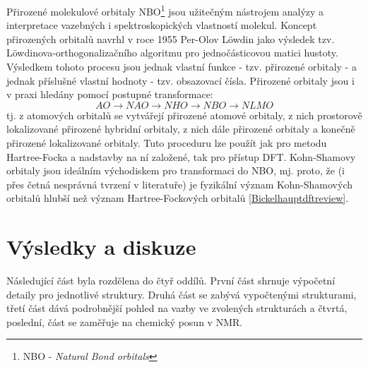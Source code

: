 \documentclass[
digital, %
table,   %
lof,     %
lot,     %
oneside,
]{fithesis3}
\begin{document}
Přirozené molekulové orbitaly NBO\footnote{NBO - \textit{Natural Bond orbitals}} jsou užitečným nástrojem analýzy a interpretace vazebných i spektroskopických vlastností molekul. Koncept přirozených orbitalů navrhl v roce 1955 Per-Olov Löwdin jako výsledek tzv. Löwdinova-orthogonalizačního algoritmu pro jednočásticovou matici hustoty. Výsledkem tohoto procesu jsou jednak vlastní funkce - tzv. přirozené orbitaly - a jednak příslušné vlastní hodnoty - tzv. obsazovací čísla. Přirozené orbitaly jsou i v praxi hledány pomocí postupné transformace:
\begin{displaymath}
AO \longrightarrow NAO \longrightarrow NHO \longrightarrow NBO \longrightarrow NLMO
\end{displaymath}
tj. z atomových orbitalů se vytvářejí přirozené atomové orbitaly, z nich prostorově lokalizované přirozené hybridní orbitaly, z nich dále přirozené orbitaly  a konečně přirozené lokalizované orbitaly. Tuto proceduru lze použít jak pro metodu Hartree-Focka a nadstavby na ní založené, tak pro přístup DFT. Kohn-Shamovy orbitaly jsou ideálním východiskem pro transformaci do NBO, mj. proto, že (i přes četná nesprávná tvrzení v literatuře) je fyzikální význam Kohn-Shamových orbitalů hlubší než význam Hartree-Fockových orbitalů \ref{Bickelhauptdftreview}.

\chapter{Výsledky a diskuze}
Následující část byla rozdělena do čtyř oddílů. První část shrnuje výpočetní detaily pro jednotlivé struktury. Druhá  část se zabývá vypočtenými strukturami, třetí část dává podrobnější pohled na vazby ve zvolených strukturách a čtvrtá, poslední, část se zaměřuje na chemický posun v NMR.
\end{document}
